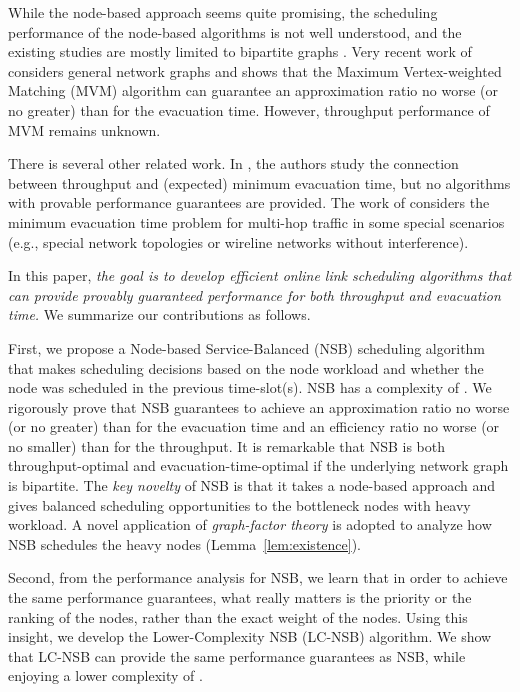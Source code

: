 \documentclass[10pt,journal,compsoc]{IEEEtran}
\begin{document}
While the node-based approach seems quite promising, the scheduling performance of the node-based algorithms 
is not well understood, and the existing studies are mostly limited to bipartite graphs \cite{mekkittikul98,tabatabaee09,guptathesis}. 
Very recent work of \cite{ji15ciss} considers general network graphs and shows that the Maximum Vertex-weighted 
Matching (MVM) algorithm can guarantee an approximation ratio no worse (or no greater) than  for the evacuation 
time. However, throughput performance of MVM remains unknown. 

There is several other related work. In \cite{georgiadis15}, the authors study the connection between 
throughput and (expected) minimum evacuation time, but no algorithms with provable performance 
guarantees are provided. The work of \cite{tassiulas95,tassiulas99,soldati09} considers the minimum 
evacuation time problem for multi-hop traffic in some special scenarios (e.g., special network topologies 
or wireline networks without interference).

In this paper, \emph{the goal is to develop efficient online link scheduling algorithms that can provide 
provably guaranteed performance for both throughput and evacuation time.} We summarize our 
contributions as follows.

First, we propose a Node-based Service-Balanced (NSB) scheduling algorithm that makes scheduling 
decisions based on the node workload and whether the node was scheduled in the previous time-slot(s). 
NSB has a complexity of .
We rigorously prove that NSB guarantees to achieve an approximation ratio no worse (or no greater) 
than  for the evacuation time and an efficiency ratio no worse (or no smaller) than  for the 
throughput. It is remarkable that NSB is both throughput-optimal and evacuation-time-optimal if the underlying 
network graph is bipartite. The \emph{key novelty} of NSB is that it takes a node-based approach and 
gives balanced scheduling opportunities to the bottleneck nodes with heavy workload. A novel application 
of \emph{graph-factor theory} is adopted to analyze how NSB schedules the heavy nodes (Lemma~\ref{lem:existence}).

Second, from the performance analysis for NSB, we learn that in order to achieve the same performance guarantees, 
what really matters is the priority or the ranking of the nodes, rather than the exact weight of the nodes. 
Using this insight, we develop the Lower-Complexity NSB (LC-NSB) algorithm. We show that LC-NSB 
can provide the same performance guarantees as NSB, while enjoying a lower complexity of .
\end{document}
